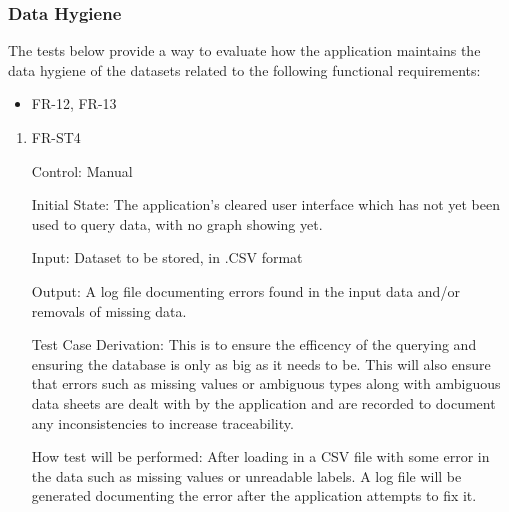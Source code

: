 \documentclass[12pt, titlepage]{article}
\begin{document}
      \subsubsection{Data Hygiene}
      The tests below provide a way to evaluate how the application maintains
      the data hygiene of the datasets related to the following functional
      requirements:
      \begin{itemize}
        \item FR-12, FR-13
      \end{itemize}
        \begin{enumerate}
        
          \item{FR-ST4}
          
          Control: Manual
                    
          Initial State: The application's cleared user interface which has not
          yet been used to query data, with no graph showing yet.
                    
          Input: Dataset to be stored, in .CSV format
                    
          Output: A log file documenting errors found in the input data and/or
          removals of missing data.
          
          Test Case Derivation: This is to ensure the efficency of the querying
          and ensuring the database is only as big as it needs to be. This will
          also ensure that errors such as missing values or ambiguous types
          along with ambiguous data sheets are dealt with by the application and
          are recorded to document any inconsistencies to increase traceability.
                    
          How test will be performed: After loading in a CSV file with some
          error in the data such as missing values or unreadable labels. A log
          file will be generated documenting the error after the application
          attempts to fix it. 
          
          \end{enumerate}
\end{document}
